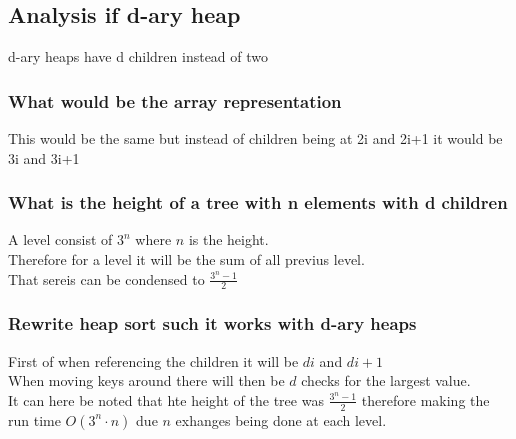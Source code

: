 \documentclass[12pt, a4paper]{article}
\begin{document}
			\subsection{Analysis if d-ary heap}
				d-ary heaps have d children instead of two
				\subsubsection{What would be the array representation}
					This would be the same but instead of children being at 2i and 2i+1 it would be 3i and 3i+1\\
				\subsubsection{What is the height of a tree with n elements with d children}
					A level consist of $3^n$ where $n$ is the height.\\
					Therefore for a level it will be the sum of all previus level.\\
					That sereis can be condensed to $\frac{3^n-1}{2}$
				\subsubsection{Rewrite heap sort such it works with d-ary heaps}
					First of when referencing the children it will be $di$ and $di+1$\\
					When moving keys around there will then be $d$ checks for the largest value.\\
					It can here be noted that hte height of the tree was $\frac{3^n-1}{2}$ therefore making the run time $O(3^n\cdot n)$ due $n$ exhanges being done at each level.
				
				
\end{document}

